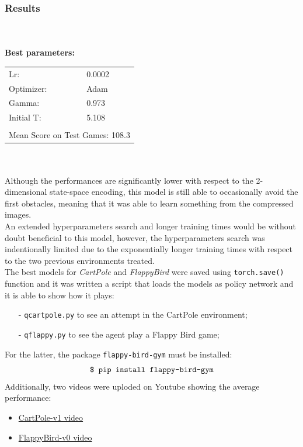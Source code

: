 \documentclass[11pt,a4paper,twocolumn]{IEEEtran}
\newcommand{\thinsepline}{\noindent\makebox[\linewidth]{\rule{7.5cm}{0.02pt}}}
\begin{document}
			\subsubsection{\textbf{Results}}\text{   }\\
			\thinsepline\\
			\textbf{Best parameters:}\medskip\\
			\begin{tabular}{ll}
				Lr: & 0.0002 \\
				Optimizer: & Adam \\
				Gamma: & 0.973 \\
				Initial T:& 5.108 \\
				\hline\\
				\multicolumn{2}{l}{Mean Score on Test Games: 108.3 }
				
			\end{tabular}\\
			\thinsepline\medskip\\
			Although the performances are significantly lower with respect to the 2-dimensional state-space encoding, this model is still able to occasionally avoid the first obstacles, meaning that it was able to learn something from the compressed images.\\
			An extended hyperparameters search and longer training times would be without doubt beneficial to this model, however, the hyperparameters search was indentionally limited due to the exponentially longer training times with respect to the two previous environments treated.\medskip\\
			The best models for \textit{CartPole} and \textit{FlappyBird} were saved using \texttt{torch.save()} function and it was written a script that loads the models as policy network and it is able to show how it plays:
			\begin{itemize}
				\item[-] \texttt{qcartpole.py} to see an attempt in the CartPole environment;
				\item[-] \texttt{qflappy.py} to see the agent play a Flappy Bird game;
			\end{itemize}
			For the latter, the package \texttt{flappy-bird-gym} must be installed\cite{GHFB}:
			$$\text{\texttt{\$ pip install flappy-bird-gym}}$$
			\newpage
			Additionally, two videos were uploded on Youtube showing the average performance:
			\begin{itemize}
				\item \href{https://www.youtube.com/watch?v=LSkuY9bjZlo}{CartPole-v1 video}
				\item \href{https://www.youtube.com/watch?v=QKapLxaR-3Q&t=14s}{FlappyBird-v0 video}
			\end{itemize} 
			
\end{document}
